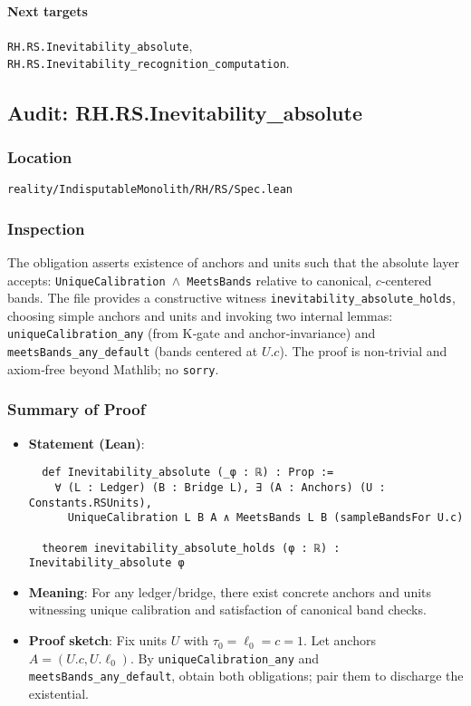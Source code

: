 \documentclass{article}
\newcommand{\FileRef}[1]{\texttt{#1}}
\begin{document}
\paragraph{Next targets} \texttt{RH.RS.Inevitability\_absolute}, \texttt{RH.RS.Inevitability\_recognition\_computation}.

\subsection{Audit: RH.RS.Inevitability\_absolute}
\subsubsection{Location}
\FileRef{reality/IndisputableMonolith/RH/RS/Spec.lean}

\subsubsection{Inspection}
The obligation asserts existence of anchors and units such that the absolute layer accepts: \texttt{UniqueCalibration \(\wedge\) MeetsBands} relative to canonical, \(c\)-centered bands. The file provides a constructive witness \texttt{inevitability\_absolute\_holds}, choosing simple anchors and units and invoking two internal lemmas: \texttt{uniqueCalibration\_any} (from K‑gate and anchor‑invariance) and \texttt{meetsBands\_any\_default} (bands centered at \(U.c\)). The proof is non‑trivial and axiom‑free beyond Mathlib; no \texttt{sorry}.

\subsubsection{Summary of Proof}
\begin{itemize}[leftmargin=*]
  \item \textbf{Statement (Lean)}:
  \begin{lstlisting}
  def Inevitability_absolute (_φ : ℝ) : Prop :=
    ∀ (L : Ledger) (B : Bridge L), ∃ (A : Anchors) (U : Constants.RSUnits),
      UniqueCalibration L B A ∧ MeetsBands L B (sampleBandsFor U.c)

  theorem inevitability_absolute_holds (φ : ℝ) : Inevitability_absolute φ
  \end{lstlisting}
  \item \textbf{Meaning}: For any ledger/bridge, there exist concrete anchors and units witnessing unique calibration and satisfaction of canonical band checks.
  \item \textbf{Proof sketch}: Fix units \(U\) with \(\tau_0=\ell_0=c=1\). Let anchors \(A=(U.c, U.\ell_0)\). By \texttt{uniqueCalibration\_any} and \texttt{meetsBands\_any\_default}, obtain both obligations; pair them to discharge the existential.
\end{itemize}
\end{document}
